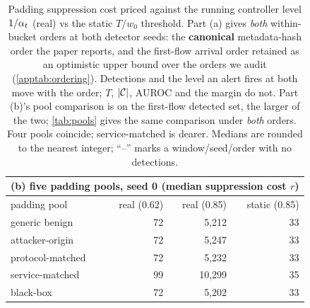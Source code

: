 \begin{table}[t]
\centering
\caption{Padding suppression cost priced against the running controller level $1/\alpha_t$
(real) vs the static $T/w_0$ threshold. Part (a) gives \emph{both} within-bucket orders at both
detector seeds: the \textbf{canonical} metadata-hash order the paper reports, and the first-flow
arrival order retained as an optimistic upper bound over the orders we audit (\cref{apptab:ordering}).
Detections and the level an alert fires at both move with the order; $T$, $\lvert\mathcal{C}\rvert$, AUROC and the
margin do not. Part (b)'s pool comparison is on the first-flow detected set, the larger of the two;
\cref{tab:pools} gives the same comparison under \emph{both} orders.
Four pools coincide; service-matched is dearer. Medians are rounded to the nearest integer; ``--''
marks a window/seed/order with no detections.}
\label{apptab:padpools}

\vspace{4pt}
\begin{tabular}{lrrr}
\toprule
\multicolumn{4}{c}{(b) five padding pools, seed 0 (median suppression cost $r$)} \\
\midrule
padding pool & real (0.62) & real (0.85) & static (0.85) \\
\midrule
generic benign & 72 & 5,212 & 33 \\
attacker-origin & 72 & 5,247 & 33 \\
protocol-matched & 72 & 5,232 & 33 \\
service-matched & 99 & 10,299 & 35 \\
black-box & 72 & 5,202 & 33 \\
\bottomrule
\end{tabular}
\end{table}
